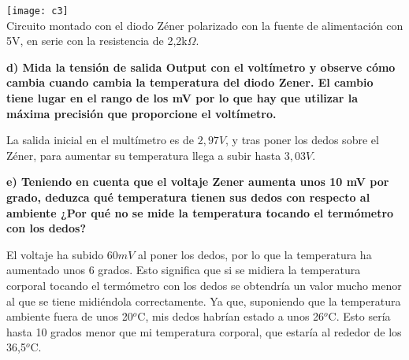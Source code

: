 \documentclass{article}
\begin{document}
\bigskip
\begin{center}
\texttt{[image: c3]}\\
Circuito montado con el diodo Zéner polarizado con la fuente de alimentación con 5V, en serie con la resistencia de 2,2k$\Omega$.
\end{center}

\bigskip
\textbf{d) Mida la tensión de salida Output con el voltímetro y observe cómo cambia cuando
cambia la temperatura del diodo Zener. El cambio tiene lugar en el rango de los mV
por lo que hay que utilizar la máxima precisión que proporcione el voltímetro.}

La salida inicial en el multímetro es de $2,97V$, y tras poner los dedos sobre el Zéner, para aumentar su temperatura llega a subir hasta $3,03V$.

\bigskip

\textbf{e) Teniendo en cuenta que el voltaje Zener aumenta unos 10 mV por grado, deduzca qué
temperatura tienen sus dedos con respecto al ambiente ¿Por qué no se mide la
temperatura tocando el termómetro con los dedos?}

El voltaje ha subido $60mV$ al poner los dedos, por lo que la temperatura ha aumentado unos 6 grados. Esto significa que si se midiera la temperatura corporal tocando el termómetro con los dedos se obtendría un valor mucho menor al que se tiene midiéndola correctamente. Ya que, suponiendo que la temperatura ambiente fuera de unos 20$^o$C, mis dedos habrían estado a unos 26$^o$C. Esto sería hasta 10 grados menor que mi temperatura corporal, que estaría al rededor de los 36,5$^o$C.
\end{document}
